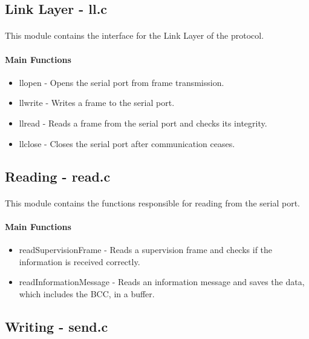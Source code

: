 \documentclass[11pt]{article}
\begin{document}
\subsection{Link Layer - ll.c}

\paragraph{}This module contains the interface for the Link Layer of the protocol.

\paragraph{Main Functions}

\begin{itemize}
        \item{llopen - Opens the serial port from frame transmission.}
        \item{llwrite - Writes a frame to the serial port.}
        \item{llread - Reads a frame from the serial port and checks its integrity.}
        \item{llclose - Closes the serial port after communication ceases.}
\end{itemize}

\subsection{Reading - read.c}

\paragraph{}This module contains the functions responsible for reading from the serial port.

\paragraph{Main Functions}

\begin{itemize}
  \item{readSupervisionFrame - Reads a supervision frame and checks if the information is received
        correctly.}
  \item{readInformationMessage - Reads an information message and saves the data, which includes the
        BCC, in a buffer.}
\end{itemize}

\subsection{Writing - send.c}
\end{document}
